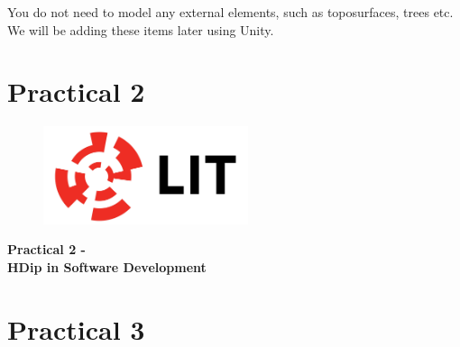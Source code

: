 \documentclass[a4paper, 10pt]{article}
\begin{document}
You do not need to model any external elements, such as toposurfaces, trees etc.  We will be adding these items later using Unity.


\newpage
\section{Practical 2}

\newpage
\setcounter{page}{1}
\begin{center}
	\begin{figure}[ht]
		\centering
		\includegraphics[width = 6cm]{img/LITlogo.jpg}
		\label{fig:logoa2}
	\end{figure}
	\Large\textbf{Practical 2 - }\\
	\large\textbf{HDip in Software Development}
\end{center}





		
		
\newpage
\section{Practical 3}
\end{document}
